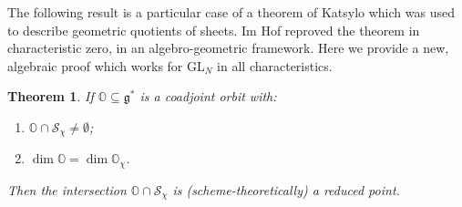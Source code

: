 \documentclass[twoside,12pt,reqno]{amsart}
\newtheorem{Theorem}{Theorem}[section]
\theoremstyle{remark}
\numberwithin{equation}{section}
\def\O{{\mathbb O}}
\def\GL{\mathrm{GL}}
\def\g{{\mathfrak g}}
\renewcommand{\S}{\mathcal{S}}
\begin{document}
The following result is a particular case of a theorem of Katsylo \cite{Kat} which was used to describe geometric quotients of sheets. Im Hof \cite{Im} reproved the theorem in characteristic zero, in an algebro-geometric framework. Here we provide a new, algebraic proof which works for $\GL_N$ in all characteristics.
\begin{Theorem}
\label{T:Katsylo}
   If $\O \subseteq \g^*$ is a coadjoint orbit with:
   \begin{enumerate}
       \item[(i)] $\O \cap \S_\chi \ne \emptyset$;
       \item[(ii)] $\dim \O = \dim \O_\chi$.
   \end{enumerate}
   Then the intersection $\O \cap \S_\chi$ is (scheme-theoretically) a reduced point.
\end{Theorem}
\end{document}
